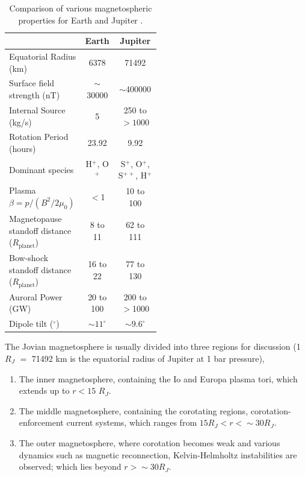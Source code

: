 \begin{table}
    \centering
    \begin{tabular}{p{0.5\linewidth}|c|c}
        &\textbf{Earth}  &\textbf{Jupiter}\\
    \hline
    Equatorial Radius (km) &6378    &71492\\
    Surface field strength (nT)  &$\sim$30000   &$\sim400000$\\
    Internal Source (kg/s)          &5   &250 to $>1000$\\
    Rotation Period (hours)         &23.92   &9.92\\
    Dominant species                &H$^+$, O$^+$   &S$^+$, O$^+$, S$^{++}$, H$^+$\\
    Plasma $\beta=p/(B^2/2\mu_0)$   &$<$1 &10 to 100\\
    Magnetopause standoff distance ($R_\text{planet}$)    &8 to 11   &62 to 111\\
    Bow-shock standoff distance ($R_\text{planet}$)   &16 to 22  &77 to 130\\
    Auroral Power (GW)              &20 to 100   &200 to $>$1000\\
    Dipole tilt ($^\circ$)  &$\sim11^\circ$   &$\sim9.6^\circ$\\
    \end{tabular}
    \caption{Comparison of various magnetospheric properties for Earth and Jupiter \protect\cite{Shue1998MagnetopauseConditions,Cairns1996MagneticShock,Khurana2004a, Krupp2004DynamicsMagnetosphere,Clarke2009,Krupp2016ComparisonMagnetospheres,Bagenal2013PlanetaryMagnetospheres}.}
    \label{tab:earth-jupiter-scales}
\end{table}

The Jovian magnetosphere is usually divided into three regions for discussion (1 $R_J$ $=$ 71492 km is the equatorial radius of Jupiter at 1 bar pressure), 

\begin{enumerate}
    \item The inner magnetosphere, containing the Io and Europa plasma tori, which extends up to $r < 15$ $R_J$.
    \item The middle magnetosphere, containing the corotating regions, corotation-enforcement current systems, which ranges from $15 R_J < r < \sim30 R_J$.
    \item The outer magnetosphere, where corotation becomes weak and various dynamics such as magnetic reconnection, Kelvin-Helmholtz instabilities are observed; which lies beyond $r > \sim30 R_J$. 
\end{enumerate}

